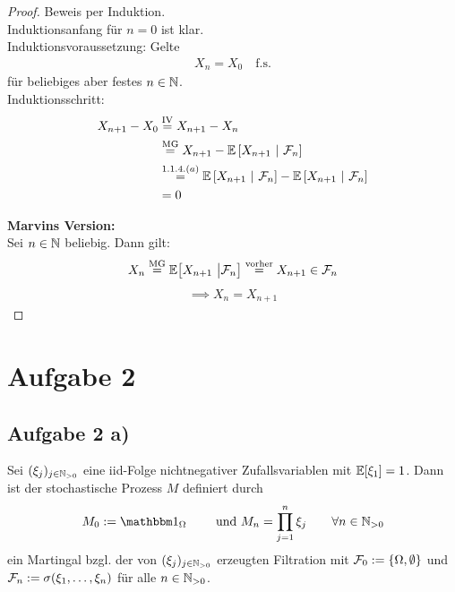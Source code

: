 \documentclass[12pt,a4paper]{article}
\begin{document}
\begin{proof}
	Beweis per Induktion.\\
	Induktionsanfang für $n=0$ ist klar.\\
	Induktionsvoraussetzung: Gelte
	\begin{align*}
		X_n = X_0 \quad \text{f.s.}
	\end{align*}
	für beliebiges aber festes $n\in\mathbb{N}$.\\
	Induktionsschritt:
	\begin{align*}
		X_{n+1}-X_0
		&\stackrel{\text{IV}}{=} X_{n+1} - X_{n} \\
		&\stackrel{\text{MG}}{=} X_{n+1} - \mathbb{E}\left[{X_{n+1}}~|~{\mathcal{F}_{n}}\right] \\
		&\stackrel{1.1.4.(a)}{=} \mathbb{E}\left[{X_{n+1}}~|~{\mathcal{F}_{n}}\right] - \mathbb{E}\left[{X_{n+1}}~|~{\mathcal{F}_{n}}\right] \\
		&= 0
	\end{align*}
	
	\textbf{Marvins Version:}\\
	Sei $n\in\mathbb{N}$ beliebig. Dann gilt:
	\begin{align*}
		X_n\stackrel{\text{MG}}{=} \mathbb{E}\big[X_{n+1}~\big|\mathcal{F}_n\big]\stackrel{\text{vorher}}{=} X_{n+1}\in\mathcal{F}_n\\
	\end{align*}
	\begin{align*}
	\implies X_n=X_{n+1}
	\end{align*}
\end{proof}

\section*{Aufgabe 2}
\subsection*{Aufgabe 2 a)}
Sei $(\xi_j)_{j\in\mathbb{N}_{>0}}$ eine iid-Folge nichtnegativer Zufallsvariablen mit $\mathbb{E}[\xi_1]=1$. Dann ist der stochastische Prozess $M$ definiert durch
\begin{align*}
M_0:=\indi_\Omega\qquad\text{ und }M_n=\prod\limits_{j=1}^n\xi_j\qquad\forall n\in\N_{>0}
\end{align*}
ein Martingal bzgl. der von $(\xi_j)_{j\in\mathbb{N}_{>0}}$ erzeugten Filtration  mit $\mathcal{F}_0:=\lbrace \Omega,\emptyset\rbrace$ und $\mathcal{F}_n:=\sigma(\xi_1,\ldots,\xi_n)$ für alle $n\in\mathbb{N}_{>0}$.
\end{document}

